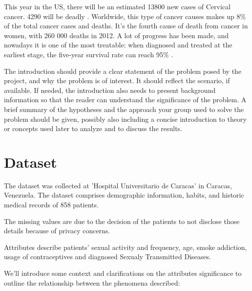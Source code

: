 This year in the US, there will be an estimated 13800 new cases of Cervical cancer. 4290 will be deadly \cite{acs}.
Worldwide, this type of cancer causes makes up 8\% of the total cancer cases and deaths. It's the fourth cause of death from cancer in women, with 260 000 deaths in 2012.
A lot of progress has been made, and nowadays it is one of the most treatable: when diagnosed and treated at the earliest stage, the five-year survival rate can reach 95\% \cite{cruk}.

The introduction should provide a clear statement of the problem posed by the project, and why the problem is of interest. It should reflect the scenario, if available. If needed, the introduction also needs to present background information so that the reader can understand the significance of the problem. A brief summary of the hypotheses and the approach your group used to solve the problem should be given, possibly also including a concise introduction to theory or concepts used later to analyze and to discuss the results.


\section{Dataset}

The dataset was collected at 'Hospital Universitario de Caracas' in Caracas, Venezuela. The dataset comprises demographic information, habits, and historic medical records of 858 patients.

The missing values are due to the decision of the patients to not disclose those details because of privacy concerns.

Attributes describe patients’ sexual activity and frequency, age, smoke addiction, usage of contraceptives and diagnosed Sexualy Transmitted Diseases.

We'll introduce some context and clarifications on the attributes significance to outline the relationship between the phenomena described:

